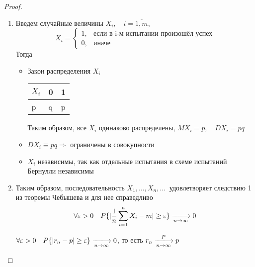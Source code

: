 \documentclass[a4paper, 12pt]{article}
\theoremstyle{definition}
\theoremstyle{leads}
\theoremstyle{example}
\newcommand{\infseq}[3]{%
	\ensuremath{#1_#2, \dots, #1_#3, \dots}\ }
\newcommand{\infseqX}{%
	\infseq{X}{1}{n}}
\begin{document}
\begin{proof}
	\begin{enumerate}
	    \item Введем случайные величины $X_i, \quad i = \overline{1,m}$, 
	    \begin{displaymath}
	    	X_i = \begin{cases}
	    	1, & \text{если в i-м испытании произошёл успех}\\
	    	0, & \text{иначе}
	    	\end{cases}
	    \end{displaymath}
	    Тогда 
	    \begin{itemize}
	    \item Закон распределения $X_i$
	    \begin{center}
	    	\centering
	        \begin{tabular}{|l|l|l|}
	    		\hline
	    		$X_i$ & 0 & 1\\ \hline
	    		p & q & p \\
	    		\hline
	    	\end{tabular}
	    \end{center}
    Таким образом, все $X_i$ одинаково распределены, $MX_i = p,\quad DX_i = pq$
    \item $DX_i \equiv pq \Longrightarrow$ ограничены в совокупности
    \item $X_i$ независимы, так как отдельные испытания в схеме испытаний Бернулли независимы
    \end{itemize}
	    \item Таким образом, последовательность $\infseqX$ удовлетворяет следствию 1 из теоремы Чебышева и для нее справедливо
	    \begin{displaymath}
	    	\forall \varepsilon > 0 \quad P\{|\frac{1}{n}\sum_{i=1}^{n}X_i - m|\geq \varepsilon\} \xlongrightarrow[n \rightarrow \infty]{} 0
	    \end{displaymath}
    \begin{center}
    	\centering
    	$\forall \varepsilon > 0 \quad P\{|r_n - p| \geq \varepsilon\} \xlongrightarrow[n \rightarrow \infty]{} 0$, то есть $r_n \xlongrightarrow[n \rightarrow \infty] {P} p$
    \end{center}
	\end{enumerate}
\end{proof}
\end{document}
